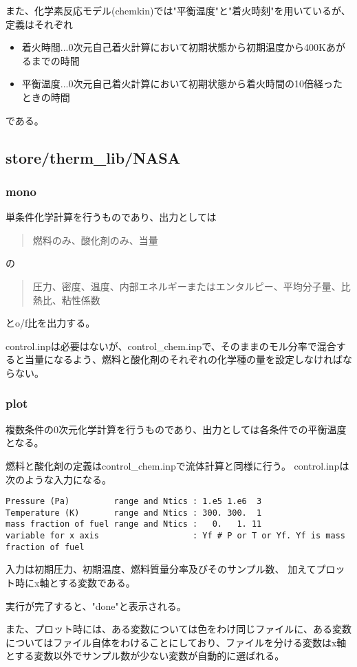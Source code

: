 \documentclass{jsarticle}
\begin{document}
また、化学素反応モデル(chemkin)では"平衡温度"と"着火時刻"を用いているが、定義はそれぞれ
\begin{itemize}
\item 着火時間...0次元自己着火計算において初期状態から初期温度から400Kあがるまでの時間
\item 平衡温度...0次元自己着火計算において初期状態から着火時間の10倍経ったときの時間
\end{itemize}
である。
\subsection{store/therm\_lib/NASA}%
\subsubsection{mono}%
単条件化学計算を行うものであり、出力としては
\begin{quotation}
燃料のみ、酸化剤のみ、当量
\end{quotation}
の
\begin{quotation}
圧力、密度、温度、内部エネルギーまたはエンタルピー、平均分子量、比熱比、粘性係数
\end{quotation}
とo/f比を出力する。

control.inpは必要はないが、control\_chem.inpで、そのままのモル分率で混合すると当量になるよう、燃料と酸化剤のそれぞれの化学種の量を設定しなければならない。
\subsubsection{plot}%
複数条件の0次元化学計算を行うものであり、出力としては各条件での平衡温度となる。

燃料と酸化剤の定義はcontrol\_chem.inpで流体計算と同様に行う。
control.inpは次のような入力になる。
\begin{verbatim}
Pressure (Pa)         range and Ntics : 1.e5 1.e6  3
Temperature (K)       range and Ntics : 300. 300.  1
mass fraction of fuel range and Ntics :   0.   1. 11
variable for x axis                   : Yf # P or T or Yf. Yf is mass fraction of fuel
\end{verbatim}
入力は初期圧力、初期温度、燃料質量分率及びそのサンプル数、
加えてプロット時にx軸とする変数である。

実行が完了すると、"done"と表示される。

また、プロット時には、ある変数については色をわけ同じファイルに、ある変数についてはファイル自体をわけることにしており、ファイルを分ける変数はx軸とする変数以外でサンプル数が少ない変数が自動的に選ばれる。
\end{document}
